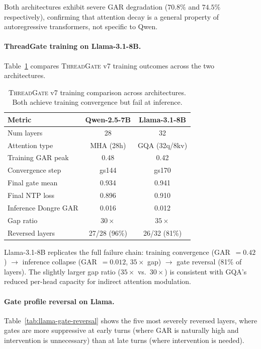 \documentclass[11pt,a4paper]{article}
\newcommand{\gar}{\textsc{GAR}}
\newcommand{\tg}{\textsc{ThreadGate}}
\begin{document}
Both architectures exhibit severe \gar{} degradation ($70.8\%$ and $74.5\%$ respectively), confirming that attention decay is a general property of autoregressive transformers, not specific to Qwen.

\paragraph{ThreadGate training on Llama-3.1-8B.}
Table~\ref{tab:llama-training} compares \tg{} v7 training outcomes across the two architectures.

\begin{table}[H]
\centering
\caption{\tg{} v7 training comparison across architectures. Both achieve training convergence but fail at inference.}
\label{tab:llama-training}
\begin{tabular}{lcc}
\toprule
\textbf{Metric} & \textbf{Qwen-2.5-7B} & \textbf{Llama-3.1-8B} \\
\midrule
Num layers        & 28       & 32 \\
Attention type    & MHA (28h) & GQA (32q/8kv) \\
Training \gar{} peak & 0.48  & 0.42 \\
Convergence step  & gs144    & gs170 \\
Final gate mean   & 0.934    & 0.941 \\
Final NTP loss    & 0.896    & 0.910 \\
Inference Dongre \gar{} & 0.016 & 0.012 \\
Gap ratio         & $30\times$ & $35\times$ \\
Reversed layers   & 27/28 (96\%) & 26/32 (81\%) \\
\bottomrule
\end{tabular}
\end{table}

Llama-3.1-8B replicates the full failure chain: training convergence (\gar{}~$=0.42$) $\to$ inference collapse (\gar{}~$=0.012$, $35\times$ gap) $\to$ gate reversal (81\% of layers).
The slightly larger gap ratio ($35\times$ vs.\ $30\times$) is consistent with GQA's reduced per-head capacity for indirect attention modulation.

\paragraph{Gate profile reversal on Llama.}
Table~\ref{tab:llama-gate-reversal} shows the five most severely reversed layers, where gates are more suppressive at early turns (where \gar{} is naturally high and intervention is unnecessary) than at late turns (where intervention is needed).
\end{document}
